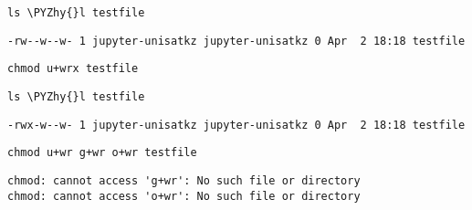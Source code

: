 \documentclass[11pt]{article}
\makeatletter
\def\PYZhy{\char`\-}
\newcommand{\boxspacing}{\kern\kvtcb@left@rule\kern\kvtcb@boxsep}
\newcommand{\prompt}[4]{
        \ttfamily\llap{{\color{#2}[#3]:\hspace{3pt}#4}}\vspace{-\baselineskip}
    }
\makeatother
\begin{document}
    \begin{tcolorbox}[breakable, size=fbox, boxrule=1pt, pad at break*=1mm,colback=cellbackground, colframe=cellborder]
\prompt{In}{incolor}{121}{\boxspacing}
\begin{Verbatim}[commandchars=\\\{\}]
ls \PYZhy{}l testfile
\end{Verbatim}
\end{tcolorbox}

    \begin{Verbatim}[commandchars=\\\{\}]
-rw--w--w- 1 jupyter-unisatkz jupyter-unisatkz 0 Apr  2 18:18 testfile
    \end{Verbatim}

    \begin{tcolorbox}[breakable, size=fbox, boxrule=1pt, pad at break*=1mm,colback=cellbackground, colframe=cellborder]
\prompt{In}{incolor}{122}{\boxspacing}
\begin{Verbatim}[commandchars=\\\{\}]
chmod u+wrx testfile
\end{Verbatim}
\end{tcolorbox}

    \begin{tcolorbox}[breakable, size=fbox, boxrule=1pt, pad at break*=1mm,colback=cellbackground, colframe=cellborder]
\prompt{In}{incolor}{124}{\boxspacing}
\begin{Verbatim}[commandchars=\\\{\}]
ls \PYZhy{}l testfile
\end{Verbatim}
\end{tcolorbox}

    \begin{Verbatim}[commandchars=\\\{\}]
-rwx-w--w- 1 jupyter-unisatkz jupyter-unisatkz 0 Apr  2 18:18 testfile
    \end{Verbatim}

    \begin{tcolorbox}[breakable, size=fbox, boxrule=1pt, pad at break*=1mm,colback=cellbackground, colframe=cellborder]
\prompt{In}{incolor}{125}{\boxspacing}
\begin{Verbatim}[commandchars=\\\{\}]
chmod u+wr g+wr o+wr testfile
\end{Verbatim}
\end{tcolorbox}

    \begin{Verbatim}[commandchars=\\\{\}]
chmod: cannot access 'g+wr': No such file or directory
chmod: cannot access 'o+wr': No such file or directory
    \end{Verbatim}
\end{document}
